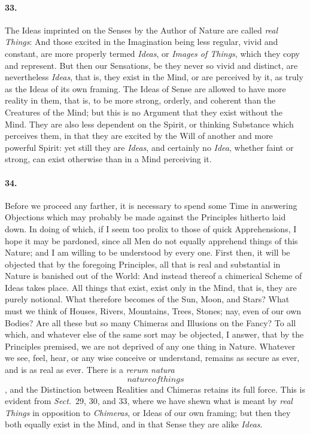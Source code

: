 \documentclass[]{article}
\newenvironment{sectionbody}{}{}
\begin{document}
\begin{sectionbody}
\paragraph{33.} The Ideas imprinted on the Senses by the Author of Nature are
called \emph{real Things}: And those excited in the Imagination
being less regular, vivid and constant, are more properly termed
\emph{Ideas}, or \emph{Images of Things}, which they copy and
represent.  But then our Sensations, be they never so vivid and
distinct, are nevertheless \emph{Ideas}, that is, they exist in
the Mind, or are perceived by it, as truly as the Ideas of its
own framing.  The Ideas of Sense are allowed to have more reality
in them, that is, to be more strong, orderly, and coherent than
the Creatures of the Mind; but this is no Argument that they
exist without the Mind.  They are also less dependent on the
Spirit, or thinking Substance which perceives them, in that they
are excited by the Will of another and more powerful Spirit: yet
still they are \emph{Ideas}, and certainly no \emph{Idea},
whether faint or strong, can exist otherwise than in a Mind
perceiving it.



\paragraph{34.} Before we proceed any farther, it is necessary to spend some Time
in answering Objections which may probably be made against the
Principles hitherto laid down.  In doing of which, if I seem too
prolix to those of quick Apprehensions, I hope it may be
pardoned, since all Men do not equally apprehend things of this
Nature; and I am willing to be understood by every one.  First
then, it will be objected that by the foregoing Principles, all
that is real and substantial in Nature is banished out of the
World: And instead thereof a chimerical Scheme of Ideas takes
place.  All things that exist, exist only in the Mind, that is,
they are purely notional.  What therefore becomes of the Sun,
Moon, and Stars?  What must we think of Houses, Rivers,
Mountains, Trees, Stones; nay, even of our own Bodies? Are all
these but so many Chimeras and Illusions on the Fancy? To all
which, and whatever else of the same sort may be objected, I
answer, that by the Principles premised, we are not deprived of
any one thing in Nature.  Whatever we see, feel, hear, or any
wise conceive or understand, remains as secure as ever, and is as
real as ever.  There is a \emph{rerum natura} \[nature of things\], and the
Distinction between Realities and Chimeras retains its full
force.  This is evident from
\emph{Sect.}\ 29, 30, and 33,
where we have shewn what is meant by
\emph{real Things} in opposition to \emph{Chimeras}, or Ideas
of our own framing; but then they both equally exist in the Mind,
and in that Sense they are alike \emph{Ideas}.




\end{sectionbody}
\end{document}
